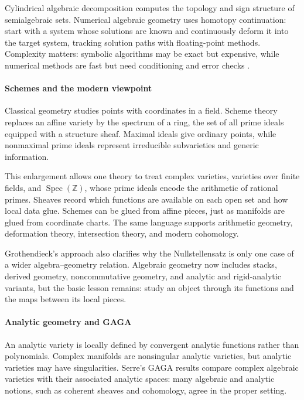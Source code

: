 Cylindrical algebraic decomposition computes the topology and sign structure of semialgebraic sets. Numerical algebraic geometry uses homotopy continuation: start with a system whose solutions are known and continuously deform it into the target system, tracking solution paths with floating-point methods. Complexity matters: symbolic algorithms may be exact but expensive, while numerical methods are fast but need conditioning and error checks \cite{algebraic_geometry_ref3,algebraic_geometry_ref6}.

\paragraph{Schemes and the modern viewpoint}

Classical geometry studies points with coordinates in a field. Scheme theory replaces an affine variety by the spectrum of a ring, the set of all prime ideals equipped with a structure sheaf. Maximal ideals give ordinary points, while nonmaximal prime ideals represent irreducible subvarieties and generic information.

This enlargement allows one theory to treat complex varieties, varieties over finite fields, and $\operatorname{Spec}(\mathbb Z)$, whose prime ideals encode the arithmetic of rational primes. Sheaves record which functions are available on each open set and how local data glue. Schemes can be glued from affine pieces, just as manifolds are glued from coordinate charts. The same language supports arithmetic geometry, deformation theory, intersection theory, and modern cohomology.

Grothendieck's approach also clarifies why the Nullstellensatz is only one case of a wider algebra--geometry relation. Algebraic geometry now includes stacks, derived geometry, noncommutative geometry, and analytic and rigid-analytic variants, but the basic lesson remains: study an object through its functions and the maps between its local pieces.

\paragraph{Analytic geometry and GAGA}

An analytic variety is locally defined by convergent analytic functions rather than polynomials. Complex manifolds are nonsingular analytic varieties, but analytic varieties may have singularities. Serre's GAGA results compare complex algebraic varieties with their associated analytic spaces: many algebraic and analytic notions, such as coherent sheaves and cohomology, agree in the proper setting.

